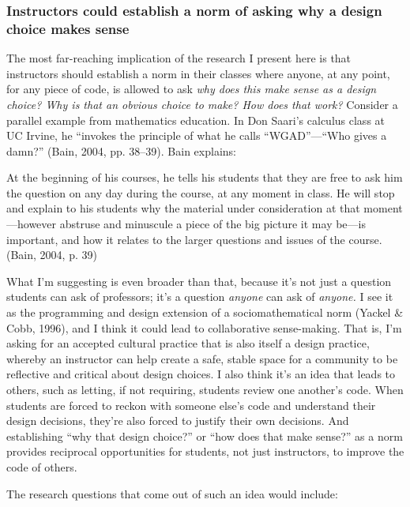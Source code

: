 \subsubsection{Instructors could establish a norm of asking why a design
choice makes
sense}\label{instructors-could-establish-a-norm-of-asking-why-a-design-choice-makes-sense}

The most far-reaching implication of the research I present here is that
instructors should establish a norm in their classes where anyone, at
any point, for any piece of code, is allowed to ask \emph{why does this
make sense as a design choice? Why is that an obvious choice to make?
How does that work?} Consider a parallel example from mathematics
education. In Don Saari's calculus class at UC Irvine, he ``invokes the
principle of what he calls ``WGAD''---``Who gives a damn?'' (Bain, 2004,
pp. 38--39). Bain explains:

At the beginning of his courses, he tells his students that they are
free to ask him the question on any day during the course, at any moment
in class. He will stop and explain to his students why the material
under consideration at that moment---however abstruse and minuscule a
piece of the big picture it may be---is important, and how it relates to
the larger questions and issues of the course. (Bain, 2004, p. 39)

What I'm suggesting is even broader than that, because it's not just a
question students can ask of professors; it's a question \emph{anyone}
can ask of \emph{anyone.} I see it as the programming and design
extension of a sociomathematical norm (Yackel \& Cobb, 1996), and I
think it could lead to collaborative sense-making. That is, I'm asking
for an accepted cultural practice that is also itself a design practice,
whereby an instructor can help create a safe, stable space for a
community to be reflective and critical about design choices. I also
think it's an idea that leads to others, such as letting, if not
requiring, students review one another's code. When students are forced
to reckon with someone else's code and understand their design
decisions, they're also forced to justify their own decisions. And
establishing ``why that design choice?'' or ``how does that make
sense?'' as a norm provides reciprocal opportunities for students, not
just instructors, to improve the code of others.

The research questions that come out of such an idea would include:


